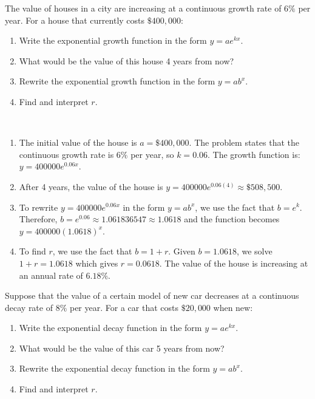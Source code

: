 \begin{example}
    The value of houses in a city are increasing at a continuous growth rate of \(6\%\) per year. For a house that currently costs \( \$400,000 \):
    \begin{enumerate}
        \item Write the exponential growth function in the form \( y = ae^{kx} \).
        \item What would be the value of this house 4 years from now?
        \item Rewrite the exponential growth function in the form \( y = ab^x \).
        \item Find and interpret \( r \).
    \end{enumerate}
\end{example}

\begin{solution}
    ~\\
    \begin{enumerate}
        \item The initial value of the house is \( a = \$400,000 \). The problem states that the continuous growth rate is \( 6\% \) per year, so \( k = 0.06 \). The growth function is: \( y = 400000e^{0.06x} \).

        \item After 4 years, the value of the house is \( y = 400000e^{0.06(4)} \approx \$508,500 \).

        \item To rewrite \( y = 400000e^{0.06x} \) in the form \( y = ab^x \), we use the fact that \( b = e^k \). Therefore, \( b = e^{0.06} \approx 1.061836547 \approx 1.0618 \) and the function becomes \( y = 400000(1.0618)^x \).

        \item To find \( r \), we use the fact that \( b = 1 + r \). Given \( b = 1.0618 \), we solve \( 1 + r = 1.0618 \) which gives \( r = 0.0618 \). The value of the house is increasing at an annual rate of \( 6.18\% \).
    \end{enumerate}
\end{solution}

\begin{example}
    Suppose that the value of a certain model of new car decreases at a continuous decay rate of \(8\%\) per year. For a car that costs \( \$20,000 \) when new:
    \begin{enumerate}
        \item Write the exponential decay function in the form \( y = ae^{kx} \).
        \item What would be the value of this car 5 years from now?
        \item Rewrite the exponential decay function in the form \( y = ab^x \).
        \item Find and interpret \( r \).
    \end{enumerate}
\end{example}

